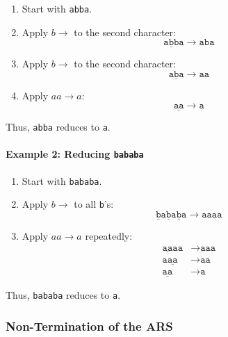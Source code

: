 \documentclass{article}
\begin{document}
\begin{enumerate}
    \item Start with \texttt{abba}.
    \item Apply $b \to$ to the second character:
    \begin{equation*}
        \texttt{a}\underline{\texttt{b}}\texttt{ba} \to \texttt{aba}
    \end{equation*}
    \item Apply $b \to$ to the second character:
    \begin{equation*}
        \texttt{a}\underline{\texttt{b}}\texttt{a} \to \texttt{aa}
    \end{equation*}
    \item Apply $aa \to a$:
    \begin{equation*}
        \underline{\texttt{aa}} \to \texttt{a}
    \end{equation*}
\end{enumerate}

Thus, \texttt{abba} reduces to \texttt{a}.

\paragraph{Example 2: Reducing \texttt{bababa}}

\begin{enumerate}
    \item Start with \texttt{bababa}.
    \item Apply $b \to$ to all \texttt{b}'s:
    \begin{equation*}
        \underline{\texttt{b}}\texttt{a}\underline{\texttt{b}}\texttt{a}\underline{\texttt{b}}\texttt{a} \to \texttt{aaaa}
    \end{equation*}
    \item Apply $aa \to a$ repeatedly:
    \begin{align*}
        \underline{\texttt{aa}}\texttt{aa} &\to \texttt{a}\texttt{aa} \\
        \texttt{a}\underline{\texttt{aa}} &\to \texttt{a}\texttt{a} \\
        \underline{\texttt{aa}} &\to \texttt{a}
    \end{align*}
\end{enumerate}

Thus, \texttt{bababa} reduces to \texttt{a}.

\subsubsection*{Non-Termination of the ARS}
\end{document}
